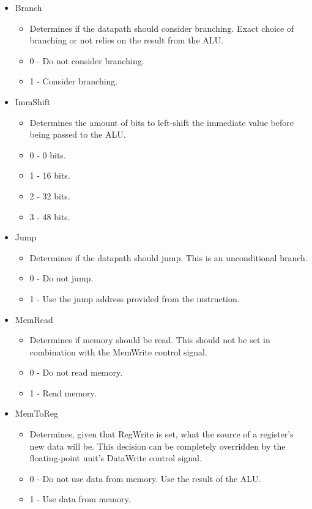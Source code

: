 \documentclass[
    paper=letter,
    parskip=half,
    fontsize=12pt,
    titlepage=firstiscover,
    toc=bibliography,
    numbers=endperiod
]{scrartcl}
\providecommand{\tightlist}{%
  \setlength{\itemsep}{0pt}\setlength{\parskip}{0pt}}
\begin{document}
\begin{itemize}
    \item Branch
          \begin{itemize}
              \tightlist
              \item Determines if the datapath should consider branching. Exact choice of
                    branching or not relies on the result from the ALU.
              \item 0 - Do not consider branching.
              \item 1 - Consider branching.
          \end{itemize}

    \item ImmShift
          \begin{itemize}
              \tightlist
              \item Determines the amount of bits to left-shift the immediate value before
                    being passed to the ALU.
              \item 0 - 0 bits.
              \item 1 - 16 bits.
              \item 2 - 32 bits.
              \item 3 - 48 bits.
          \end{itemize}

    \item Jump
          \begin{itemize}
              \tightlist
              \item Determines if the datapath should jump. This is an unconditional branch.
              \item 0 - Do not jump.
              \item 1 - Use the jump address provided from the instruction.
          \end{itemize}

    \item MemRead
          \begin{itemize}
              \tightlist
              \item Determines if memory should be read. This should not be set in
                    combination with the MemWrite control signal.
              \item 0 - Do not read memory.
              \item 1 - Read memory.
          \end{itemize}

    \item MemToReg
          \begin{itemize}
              \tightlist
              \item Determines, given that RegWrite is set, what the source of a register's
                    new data will be. This decision can be completely overridden by the
                    floating-point unit's DataWrite control signal.
              \item 0 - Do not use data from memory. Use the result of the ALU.
              \item 1 - Use data from memory.
          \end{itemize}


\end{itemize}
\end{document}
